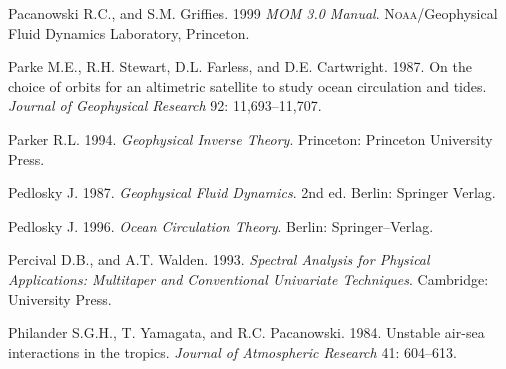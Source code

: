 \begin{thebibliography}{999}
Pacanowski R.C., and S.M. Griffies.  1999 \textit{MOM 3.0 Manual}.
\textsc{Noaa}/Geophysical Fluid Dynamics Laboratory, Princeton.
%

Parke M.E., R.H. Stewart, D.L. Farless, and D.E. Cartwright. 1987. On
the choice of orbits for an altimetric satellite to study ocean
circulation and tides. \textit{Journal of Geophysical Research} 92:
11,693--11,707.
%

Parker R.L.  1994. \textit{Geophysical Inverse Theory}. Princeton:
Princeton University Press.
%

Pedlosky J.  1987. \textit{Geophysical Fluid Dynamics}. 2nd ed.
Berlin: Springer Verlag.
%

Pedlosky J.  1996. \textit{Ocean Circulation Theory}.  Berlin:
Springer--Verlag.
%

Percival D.B., and A.T. Walden.  1993. \textit{Spectral Analysis for
  Physical Applications: Multitaper and Conventional Univariate
  Techniques}.  Cambridge: University Press.
%

Philander S.G.H., T. Yamagata, and R.C. Pacanowski. 1984. Unstable
air-sea interactions in the tropics. \textit{Journal of Atmospheric
  Research} 41: 604--613.
%


\end{thebibliography}
